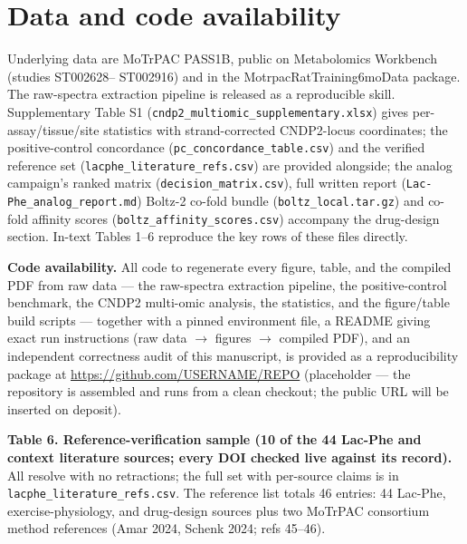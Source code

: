 \documentclass[11pt]{article}
\begin{document}
\section*{Data and code availability}

Underlying data are MoTrPAC PASS1B, public on Metabolomics Workbench (studies ST002628--
ST002916) and in the MotrpacRatTraining6moData package. The raw-spectra extraction
pipeline is released as a reproducible skill. Supplementary Table S1
(\texttt{cndp2\_multiomic\_supplementary.xlsx}) gives per-assay/tissue/site statistics with strand-corrected CNDP2-locus coordinates; the
positive-control concordance (\texttt{pc\_concordance\_table.csv}) and the verified reference set
(\texttt{lacphe\_literature\_refs.csv}) are provided alongside; the analog campaign's ranked matrix (\texttt{decision\_matrix.csv}), full written report (\texttt{Lac-Phe\_analog\_report.md}) Boltz-2 co-fold bundle (\texttt{boltz\_local.tar.gz}) and co-fold affinity scores (\texttt{boltz\_affinity\_scores.csv}) accompany the drug-design section. In-text Tables 1--6 reproduce the
key rows of these files directly.

\textbf{Code availability.} All code to regenerate every figure, table, and the compiled PDF
from raw data --- the raw-spectra extraction pipeline, the positive-control benchmark, the
CNDP2 multi-omic analysis, the statistics, and the figure/table build scripts --- together
with a pinned environment file, a README giving exact run instructions (raw data $\rightarrow$
figures $\rightarrow$ compiled PDF), and an independent correctness audit of this manuscript, is
provided as a reproducibility package at \url{https://github.com/USERNAME/REPO}
(placeholder --- the repository is assembled and runs from a clean checkout; the public URL
will be inserted on deposit).


\textbf{Table 6. Reference-verification sample (10 of the 44 Lac-Phe and context literature sources; every DOI checked live against its record).} All resolve with no retractions; the full set with per-source claims is in \texttt{lacphe\_literature\_refs.csv}. The reference list totals 46 entries: 44 Lac-Phe, exercise-physiology, and drug-design sources plus two MoTrPAC consortium method references (Amar 2024, Schenk 2024; refs 45--46).
\end{document}
